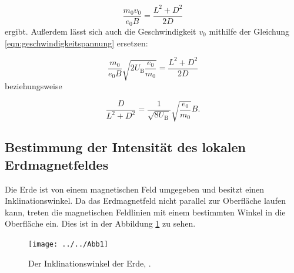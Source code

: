 \begin{equation}
\frac{m_0 v_0}{e_0 B} = \frac{L^2 + D^2}{2D} 
\end{equation}
ergibt. Außerdem lässt sich auch die Geschwindigkeit $v_0$ mithilfe der Gleichung \ref{eqn:geschwindigkeitspannung} ersetzen:

\begin{equation}
\frac{m_0}{e_0 B} \sqrt{2 U_{\text{B}} \frac{e_0}{m_0}} = \frac{L^2 + D^2}{2D}
\end{equation}
beziehungsweise

\begin{equation}
\label{eqn:letzte}
\frac{D}{L^2 + D^2} = \frac{1}{\sqrt{8 U_{\text{B}}}} \sqrt{\frac{e_0}{m_0}} B.
\end{equation}

\subsection{Bestimmung der Intensität des lokalen Erdmagnetfeldes}
Die Erde ist von einem magnetischen Feld umgegeben und besitzt einen Inklinationswinkel. Da das Erdmagnetfeld nicht parallel zur Oberfläche laufen kann, treten die magnetischen Feldlinien mit einem bestimmten Winkel in die Oberfläche ein. Dies ist in der Abbildung \ref{fig:abb1} zu sehen. 

\begin{figure}[h!]
	\centering
	\texttt{[image: ../../Abb1]}
	\caption{Der Inklinationswinkel der Erde, \cite{Inklinationswinkel}.}
	\label{fig:abb1}
\end{figure}
